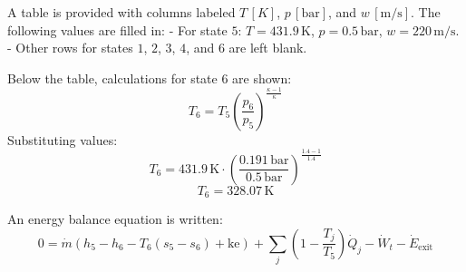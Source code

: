 A table is provided with columns labeled \( T \, [K] \), \( p \, [\text{bar}] \), and \( w \, [\text{m/s}] \). The following values are filled in:  
- For state \( 5 \): \( T = 431.9 \, \text{K} \), \( p = 0.5 \, \text{bar} \), \( w = 220 \, \text{m/s} \).  
- Other rows for states \( 1 \), \( 2 \), \( 3 \), \( 4 \), and \( 6 \) are left blank.  

Below the table, calculations for state \( 6 \) are shown:  
\[
T_6 = T_5 \left( \frac{p_6}{p_5} \right)^{\frac{\kappa - 1}{\kappa}}  
\]
Substituting values:  
\[
T_6 = 431.9 \, \text{K} \cdot \left( \frac{0.191 \, \text{bar}}{0.5 \, \text{bar}} \right)^{\frac{1.4 - 1}{1.4}}  
\]
\[
T_6 = 328.07 \, \text{K}  
\]

An energy balance equation is written:  
\[
0 = \dot{m} \left( h_5 - h_6 - T_6 (s_5 - s_6) + \text{ke} \right) + \sum_j \left( 1 - \frac{T_j}{T_5} \right) \dot{Q}_j - \dot{W}_t - \dot{E}_{\text{exit}}  
\]